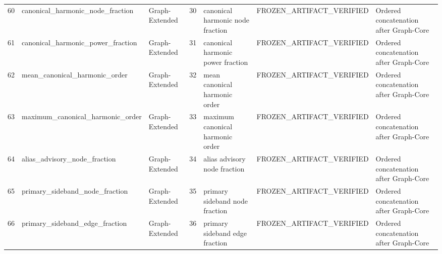 \begin{longtable}{lllllll}
60 & canonical\_harmonic\_node\_fraction & Graph-Extended & 30 & canonical harmonic node fraction & FROZEN\_ARTIFACT\_VERIFIED & Ordered concatenation after Graph-Core \\
61 & canonical\_harmonic\_power\_fraction & Graph-Extended & 31 & canonical harmonic power fraction & FROZEN\_ARTIFACT\_VERIFIED & Ordered concatenation after Graph-Core \\
62 & mean\_canonical\_harmonic\_order & Graph-Extended & 32 & mean canonical harmonic order & FROZEN\_ARTIFACT\_VERIFIED & Ordered concatenation after Graph-Core \\
63 & maximum\_canonical\_harmonic\_order & Graph-Extended & 33 & maximum canonical harmonic order & FROZEN\_ARTIFACT\_VERIFIED & Ordered concatenation after Graph-Core \\
64 & alias\_advisory\_node\_fraction & Graph-Extended & 34 & alias advisory node fraction & FROZEN\_ARTIFACT\_VERIFIED & Ordered concatenation after Graph-Core \\
65 & primary\_sideband\_node\_fraction & Graph-Extended & 35 & primary sideband node fraction & FROZEN\_ARTIFACT\_VERIFIED & Ordered concatenation after Graph-Core \\
66 & primary\_sideband\_edge\_fraction & Graph-Extended & 36 & primary sideband edge fraction & FROZEN\_ARTIFACT\_VERIFIED & Ordered concatenation after Graph-Core \\
\bottomrule
\end{longtable}
